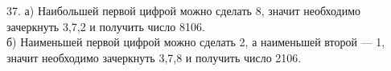 37. а) Наибольшей первой цифрой можно сделать 8, значит необходимо зачеркнуть 3,7,2 и получить число 8106.\\
б) Наименьшей первой цифрой можно сделать 2, а наименьшей второй --- 1, значит необходимо зачеркнуть 3,7,8 и получить число 2106.\\
